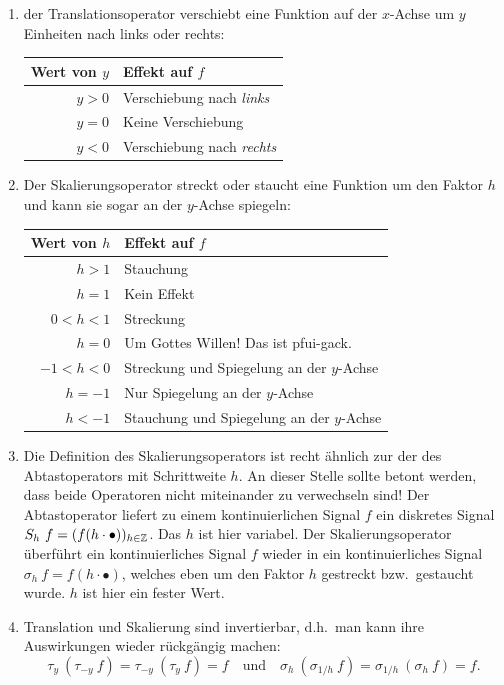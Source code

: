 \begin{remark} \leavevmode
\begin{enumerate}
\item der Translationsoperator verschiebt eine Funktion auf der $ x $-Achse um $ y $ Einheiten nach 
links oder rechts:
\par
\begin{center}
  \begin{tabular}{rl} \toprule
  Wert von $ y $ & Effekt auf $ f $ \\ \midrule
  $ y > 0 $ & Verschiebung nach \emph{links} \\
  $ y = 0 $ & Keine Verschiebung \\
  $ y < 0 $ & Verschiebung nach \emph{rechts} \\ \bottomrule
  \end{tabular}
\end{center}
\item Der Skalierungsoperator streckt oder staucht eine Funktion um den Faktor $ h $ und kann sie 
sogar an der $ y $-Achse spiegeln:\par
\begin{center}
  \begin{tabular}{rl} \toprule
  Wert von $ h $ & Effekt auf $ f $ \\ \midrule
  $ h > 1 $ & Stauchung \\
  $ h = 1 $ & Kein Effekt \\
  $ 0 < h < 1 $ & Streckung \\ \midrule
  $ h = 0 $ & Um Gottes Willen! Das ist pfui-gack. \\ \midrule
  $ -1 < h < 0 $ & Streckung und Spiegelung an der $ y $-Achse \\
  $ h = -1 $ & Nur Spiegelung an der $ y $-Achse \\
  $ h < -1 $ & Stauchung und Spiegelung an der $ y $-Achse \\ \bottomrule
  \end{tabular}
\end{center}
\item Die Definition des Skalierungsoperators ist recht ähnlich zur der des Abtastoperators mit
  Schrittweite $ h $. An dieser Stelle sollte betont werden, dass beide Operatoren nicht miteinander
  zu verwechseln sind! Der Abtastoperator liefert zu einem kontinuierlichen Signal $ f $
  ein diskretes Signal $ S_{h} \ f = (f(h \cdot \bullet))_{h \in \mathbb{Z}} $. Das $ h $ ist hier 
  variabel. Der Skalierungsoperator überführt ein kontinuierliches Signal $ f $ wieder in ein 
  kontinuierliches Signal $ \sigma_{h} \ f = f(h \cdot \bullet) $, welches eben um den Faktor $ h $ 
  gestreckt bzw.\ gestaucht wurde. $ h $ ist hier ein fester Wert.
\item Translation und Skalierung sind invertierbar, d.h.\ man kann ihre Auswirkungen wieder
rückgängig machen:
\[
  \tau_{y} \ (\tau_{-y} \ f) = \tau_{-y} \ (\tau_{y} \ f) = f \quad \text{und} \quad
  \sigma_{h} \ (\sigma_{1/h} \ f) = \sigma_{1/h} \ (\sigma_{h} \ f) = f.
\]
\end{enumerate}
\end{remark}

